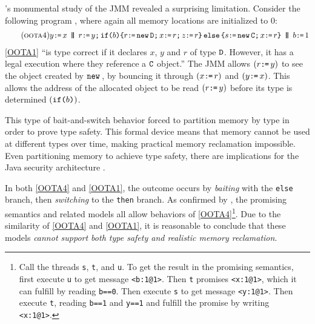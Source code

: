 \citeauthor{DBLP:journals/toplas/Lochbihler13}'s
monumental study of the JMM
revealed a surprising limitation. Consider the following program
\citep[Fig.~8]{DBLP:journals/toplas/Lochbihler13}, where again
all memory locations are initialized to $0$:
\begin{gather}
  \tag{\textsc{oota4}}\label{OOTA1}
  y\GETS x
  \PAR
  \aReg\GETS y \SEMI \IF{b} \THEN \aReg \GETS \NEW \classD \SEMI x \GETS \aReg \SEMI z\GETS \aReg \ELSE \bReg \GETS \NEW \classC \SEMI x \GETS \aReg \FI  
  \PAR %
  b \GETS 1
\end{gather}
\ref{OOTA1} ``is type correct if it declares $x$, $y$ and $r$ of type
$\mathtt{D}$. However, it has a legal execution where they reference a $\mathtt{C}$
object.''  The JMM allows $(r\texttt{:}\mkern-1mu\texttt{=}\, y)$ to see the object created by
$\texttt{new}\,$, by bouncing it through $(x \texttt{:}\mkern-1mu\texttt{=}\, r)$ and $(y\texttt{:}\mkern-1mu\texttt{=}\, x)$.  This
allows the address of the allocated object to be read $(r\texttt{:}\mkern-1mu\texttt{=}\, y)$ before
its type is determined $(\texttt{if}\allowbreak\texttt{(}b\texttt{)})$.



This type of {bait-and-switch} behavior forced
\citeauthor{DBLP:journals/toplas/Lochbihler13} to partition memory by type in
order to prove type safety.  This formal device means that memory cannot be
used at different types over time, making practical memory reclamation
impossible.  Even partitioning memory to achieve type safety, there are
implications for the Java security architecture
\cite[]{DBLP:journals/toplas/Lochbihler13}.

In both \ref{OOTA4} and \ref{OOTA1}, the \oota{} outcome occurs by
\emph{baiting} with the \texttt{else} branch, then \emph{switching} to the
\texttt{then} branch.  As confirmed by \cite{kang,soham}, the promising
semantics \cite{DBLP:conf/popl/KangHLVD17} and related models
\citep{DBLP:conf/esop/JagadeesanPR10,DBLP:journals/pacmpl/ChakrabortyV19} all
allow \oota{} behaviors of \ref{OOTA4}\footnote{Call the threads \texttt{s},
  \texttt{t}, and \texttt{u}.  To get the result in the promising semantics,
  first execute \texttt{u} to get message \texttt{<b:1@1>}.  Then \texttt{t}
  promises \texttt{<x:1@1>}, which it can fulfill by reading \texttt{b==0}.
  Then execute \texttt{s} to get message \texttt{<y:1@1>}.  Then execute
  \texttt{t}, reading \texttt{b==1} and \texttt{y==1} and fulfill the promise
  by writing \texttt{<x:1@1>}.}.  Due to the similarity of \ref{OOTA4} and
\ref{OOTA1}, it is reasonable to conclude that these models \emph{cannot
  support both type safety and realistic memory reclamation}.

